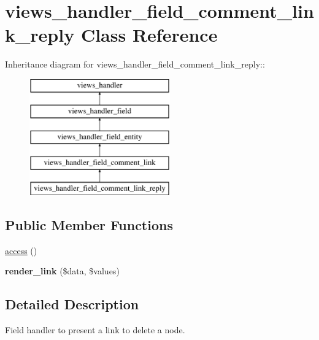 \hypertarget{classviews__handler__field__comment__link__reply}{
\section{views\_\-handler\_\-field\_\-comment\_\-link\_\-reply Class Reference}
\label{classviews__handler__field__comment__link__reply}
}
Inheritance diagram for views\_\-handler\_\-field\_\-comment\_\-link\_\-reply::\begin{figure}[H]
\begin{center}
\leavevmode
\includegraphics[height=5cm]{classviews__handler__field__comment__link__reply}
\end{center}
\end{figure}
\subsection*{Public Member Functions}
\begin{DoxyCompactItemize}
\item 
\hyperlink{classviews__handler__field__comment__link__reply_a62a569f6e9af558f67bedfabde5cef55}{access} ()
\item 
\hypertarget{classviews__handler__field__comment__link__reply_a658e2f48273a98972049137a88d4d94f}{
{\bfseries render\_\-link} (\$data, \$values)}
\label{classviews__handler__field__comment__link__reply_a658e2f48273a98972049137a88d4d94f}

\end{DoxyCompactItemize}


\subsection{Detailed Description}
Field handler to present a link to delete a node. 

